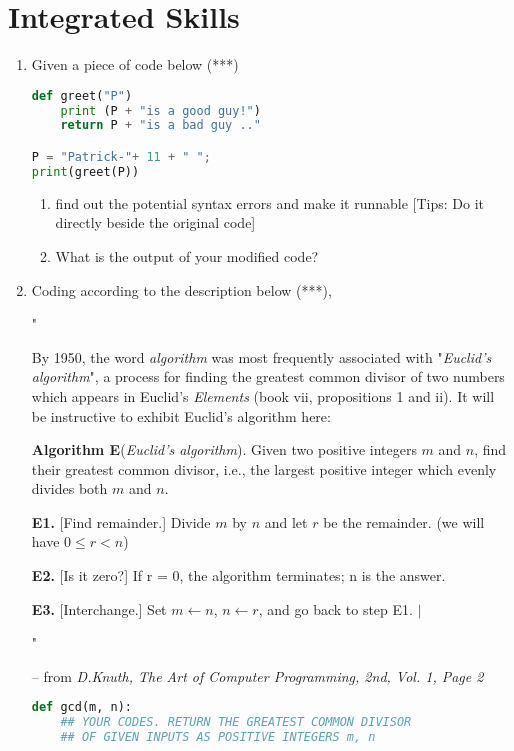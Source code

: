 \documentclass[11pt]{amsart}
\begin{document}
\section{Integrated Skills}
\begin{enumerate}
\item Given a piece of code below (***)

\begin{lstlisting}[language=Python]
def greet("P")
	print (P + "is a good guy!")
	return P + "is a bad guy .."

P = "Patrick-"+ 11 + " ";
print(greet(P))
\end{lstlisting}

\begin{enumerate}
\item find out the potential syntax errors and make it runnable [Tips: Do it directly beside the original code]
\item What is the output of your modified code?
\end{enumerate}


\item Coding according to the description below (***),

"

By 1950, the word \textit{algorithm} was most frequently associated with "\textit{Euclid's algorithm}", a process for finding the greatest common
divisor of two numbers which appears in Euclid's \textit{Elements} (book vii, propositions 1 and ii). It will be instructive to exhibit Euclid's algorithm here:

\textbf{Algorithm E}(\textit{Euclid's algorithm}). Given two positive integers $m$ and $n$, find their greatest common divisor, i.e., the largest positive integer which evenly divides both 
$m$ and $n$.

\textbf{E1.} [Find remainder.] Divide $m$ by $n$ and let $r$ be the remainder. (we will have $0\le{r}<n$)

\textbf{E2.} [Is it zero?] If r = 0, the algorithm terminates; n is the answer.

\textbf{E3.} [Interchange.] Set $m \gets n$, $n \gets r$, and go back to step E1. $|$




"

-- from \textit{D.Knuth, The Art of Computer Programming, 2nd, Vol. 1, Page 2}


\begin{lstlisting}[language=Python]
def gcd(m, n):
	## YOUR CODES. RETURN THE GREATEST COMMON DIVISOR 
	## OF GIVEN INPUTS AS POSITIVE INTEGERS m, n


\end{lstlisting}
\end{enumerate}
\end{document}
